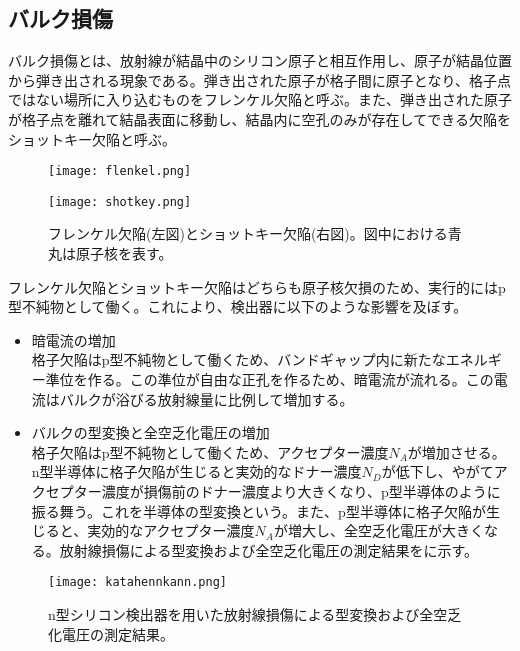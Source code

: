 \subsection{バルク損傷}
\label{sec:baruku}
バルク損傷とは、放射線が結晶中のシリコン原子と相互作用し、原子が結晶位置から弾き出される現象である。弾き出された原子が格子間に原子となり、格子点ではない場所に入り込むものをフレンケル欠陥と呼ぶ。また、弾き出された原子が格子点を離れて結晶表面に移動し、結晶内に空孔のみが存在してできる欠陥をショットキー欠陥と呼ぶ。
\begin{figure}[tbp]
  \begin{minipage}[b]{0.45\linewidth}
    \centering
    \texttt{[image: flenkel.png]}
  \end{minipage}
  \begin{minipage}[b]{0.45\linewidth}
    \centering
    \texttt{[image: shotkey.png]}
  \end{minipage}
  \caption[フレンケル欠陥とショットキー欠陥]{フレンケル欠陥(左図)とショットキー欠陥(右図)。図中における青丸は原子核を表す。}
  \label{fig:kekkan}
\end{figure}


フレンケル欠陥とショットキー欠陥はどちらも原子核欠損のため、実行的にはp型不純物として働く。これにより、検出器に以下のような影響を及ぼす。
\begin{itemize}
  \item 暗電流の増加\\
  格子欠陥はp型不純物として働くため、バンドギャップ内に新たなエネルギー準位を作る。この準位が自由な正孔を作るため、暗電流が流れる。この電流はバルクが浴びる放射線量に比例して増加する。
  \item バルクの型変換と全空乏化電圧の増加\\
  格子欠陥はp型不純物として働くため、アクセプター濃度$N_A$が増加させる。n型半導体に格子欠陥が生じると実効的なドナー濃度$N_D$が低下し、やがてアクセプター濃度が損傷前のドナー濃度より大きくなり、p型半導体のように振る舞う。これを半導体の型変換という。また、p型半導体に格子欠陥が生じると、実効的なアクセプター濃度$N_A$が増大し、全空乏化電圧が大きくなる。放射線損傷による型変換および全空乏化電圧の測定結果をに示す。
\end{itemize}
\begin{figure}[tbp]
  \centering
  \texttt{[image: katahennkann.png]}
  \caption[放射線損傷による型変換および全空乏化電圧の測定結果]{n型シリコン検出器を用いた放射線損傷による型変換および全空乏化電圧の測定結果\cite{typeinversion}。}
  \label{fig:katahennkann}
\end{figure}



